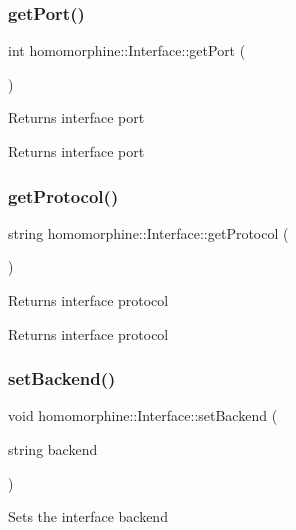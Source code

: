 \subsubsection{\texorpdfstring{get\+Port()}{getPort()}}
{\footnotesize\ttfamily int homomorphine\+::\+Interface\+::get\+Port (\begin{DoxyParamCaption}{ }\end{DoxyParamCaption})}

Returns interface port

\begin{DoxyReturn}{Returns}
interface port 
\end{DoxyReturn}
\mbox{\label{classhomomorphine_1_1_interface_afa73852700146c2957b425c8c0b19c55}} 
\subsubsection{\texorpdfstring{get\+Protocol()}{getProtocol()}}
{\footnotesize\ttfamily string homomorphine\+::\+Interface\+::get\+Protocol (\begin{DoxyParamCaption}{ }\end{DoxyParamCaption})}

Returns interface protocol

\begin{DoxyReturn}{Returns}
interface protocol 
\end{DoxyReturn}
\mbox{\label{classhomomorphine_1_1_interface_a46885f3cab9a833941201dceb370a6f4}} 
\subsubsection{\texorpdfstring{set\+Backend()}{setBackend()}}
{\footnotesize\ttfamily void homomorphine\+::\+Interface\+::set\+Backend (\begin{DoxyParamCaption}\item[{string}]{backend }\end{DoxyParamCaption})}

Sets the interface backend


